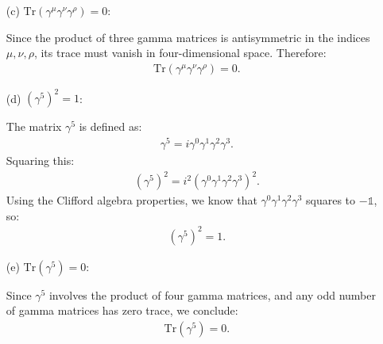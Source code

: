 \begin{enumerate}
\item [(c)] $\text{Tr}(\gamma^\mu \gamma^\nu \gamma^\rho) = 0$:

Since the product of three gamma matrices is antisymmetric in the indices $\mu, \nu, \rho$, its trace must vanish in four-dimensional space. Therefore:
\begin{align*}
    \text{Tr}(\gamma^\mu \gamma^\nu \gamma^\rho) = 0.
\end{align*}
\item [(d)] $(\gamma^5)^2 = 1$:

The matrix $\gamma^5$ is defined as:
\begin{align*}
    \gamma^5 = i \gamma^0 \gamma^1 \gamma^2 \gamma^3.
\end{align*}
Squaring this:
\begin{align*}
    (\gamma^5)^2 = i^2 (\gamma^0 \gamma^1 \gamma^2 \gamma^3)^2.
\end{align*}
Using the Clifford algebra properties, we know that $\gamma^0 \gamma^1 \gamma^2 \gamma^3$ squares to $-\mathds{1}$, so:
\begin{align*}
    (\gamma^5)^2 = 1.
\end{align*}

\item [(e)] $\text{Tr}(\gamma^5) = 0$:

Since $\gamma^5$ involves the product of four gamma matrices, and any odd number of gamma matrices has zero trace, we conclude:
\begin{align*}
    \text{Tr}(\gamma^5) = 0.
\end{align*}
\end{enumerate}